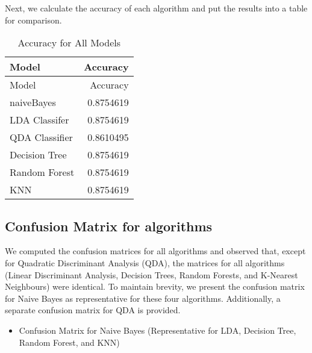 \documentclass[
]{article}
\newenvironment{Shaded}{\begin{snugshade}}{\end{snugshade}}
\newcommand{\AttributeTok}[1]{\textcolor[rgb]{0.13,0.29,0.53}{#1}}
\newcommand{\DecValTok}[1]{\textcolor[rgb]{0.00,0.00,0.81}{#1}}
\newcommand{\FunctionTok}[1]{\textcolor[rgb]{0.13,0.29,0.53}{\textbf{#1}}}
\newcommand{\NormalTok}[1]{#1}
\newcommand{\OtherTok}[1]{\textcolor[rgb]{0.56,0.35,0.01}{#1}}
\newcommand{\SpecialCharTok}[1]{\textcolor[rgb]{0.81,0.36,0.00}{\textbf{#1}}}
\newcommand{\StringTok}[1]{\textcolor[rgb]{0.31,0.60,0.02}{#1}}
\providecommand{\tightlist}{%
  \setlength{\itemsep}{0pt}\setlength{\parskip}{0pt}}
\begin{document}
Next, we calculate the accuracy of each algorithm and put the results
into a table for comparison.

\begin{longtable}[]{@{}lr@{}}
\caption{Accuracy for All Models}\tabularnewline
\toprule\noalign{}
Model & Accuracy \\
\midrule\noalign{}
\endfirsthead
\toprule\noalign{}
Model & Accuracy \\
\midrule\noalign{}
\endhead
\bottomrule\noalign{}
\endlastfoot
naiveBayes & 0.8754619 \\
LDA Classifer & 0.8754619 \\
QDA Classifier & 0.8610495 \\
Decision Tree & 0.8754619 \\
Random Forest & 0.8754619 \\
KNN & 0.8754619 \\
\end{longtable}

\hypertarget{confusion-matrix-for-algorithms}{%
\subsection{Confusion Matrix for
algorithms}\label{confusion-matrix-for-algorithms}}

We computed the confusion matrices for all algorithms and observed that,
except for Quadratic Discriminant Analysis (QDA), the matrices for all
algorithms (Linear Discriminant Analysis, Decision Trees, Random
Forests, and K-Nearest Neighbours) were identical. To maintain brevity,
we present the confusion matrix for Naive Bayes as representative for
these four algorithms. Additionally, a separate confusion matrix for QDA
is provided.

\begin{itemize}
\tightlist
\item
  Confusion Matrix for Naive Bayes (Representative for LDA, Decision
  Tree, Random Forest, and KNN)
\end{itemize}

\begin{Shaded}
\end{Shaded}
\end{document}

